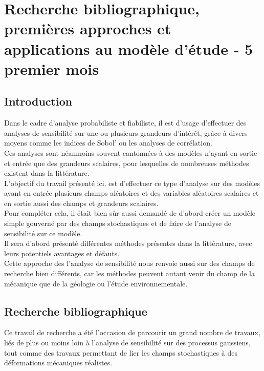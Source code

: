 \documentclass[a4paper,10pt]{article}
\begin{document}
\newpage
\section{Recherche bibliographique, premières approches et applications au modèle d'étude - 5 premier mois}
\subsection{Introduction}
Dans le cadre d'analyse probabiliste et fiabiliste, il est d'usage d’effectuer des analyses de sensibilité sur une ou plusieurs grandeurs d’intérêt, grâce à divers moyens comme les indices de Sobol' ou les analyses de corrélation. \\
Ces analyses sont néanmoins souvent cantonnées à des modèles n'ayant en sortie et entrée que des grandeurs scalaires, pour lesquelles de nombreuses méthodes existent dans la littérature.\\
L'objectif du travail présenté ici, est d’effectuer ce type d'analyse sur des modèles ayant en entrée plusieurs champs aléatoires et des variables aléatoires scalaires et en sortie aussi des champs et grandeurs scalaires. \\ Pour compléter cela, il était bien sûr aussi demandé de d'abord créer un modèle simple gouverné par des champs stochastiques et de faire de l'analyse de sensibilité sur ce modèle. \\
Il sera d'abord présenté différentes méthodes présentes dans la littérature, avec leurs potentiels avantages et défauts. \\ 
Cette approche des l'analyse de sensibilité nous renvoie aussi sur des champs de recherche bien différents, car les méthodes peuvent autant venir du champ de la mécanique que de la géologie ou l'étude environnementale.

 
\subsection{Recherche bibliographique}
Ce travail de recherche a été l'occasion de parcourir un grand nombre de travaux, liés de plus ou moins loin à l'analyse de sensibilité sur des processus gaussiens, tout comme des travaux permettant de lier les champs stochastiques à des déformations mécaniques réalistes.\par \smallskip
\end{document}
